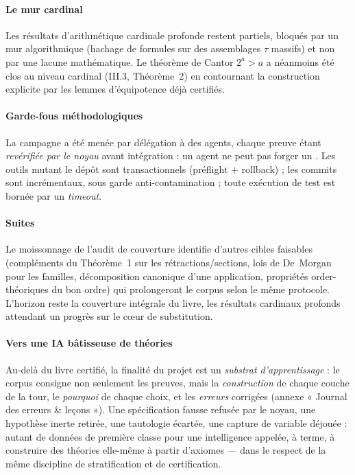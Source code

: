 \paragraph{Le mur cardinal} Les résultats d'arithmétique cardinale profonde
restent partiels, bloqués par un mur algorithmique (hachage de formules sur des
assemblages $\tau$ massifs) et non par une lacune mathématique. Le théorème de
Cantor $2^a > a$ a néanmoins été clos au niveau cardinal (III.3, Théorème~2) en
contournant la construction explicite par les lemmes d'équipotence déjà
certifiés.

\paragraph{Garde-fous méthodologiques} La campagne a été menée par délégation à
des agents, chaque preuve étant \emph{revérifiée par le noyau} avant
intégration : un agent ne peut pas forger un \theoreme{}. Les outils mutant le
dépôt sont transactionnels (préflight $+$ rollback) ; les commits sont
incrémentaux, sous garde anti-contamination ; toute exécution de test est bornée
par un \emph{timeout}.

\paragraph{Suites} Le moissonnage de l'audit de couverture identifie d'autres
cibles faisables (compléments du Théorème~1 sur les rétractions/sections, lois
de De~Morgan pour les familles, décomposition canonique d'une application,
propriétés order-théoriques du bon ordre) qui prolongeront le corpus selon le
même protocole. L'horizon reste la couverture intégrale du livre, les résultats
cardinaux profonds attendant un progrès sur le c\oe ur de substitution.

\paragraph{Vers une IA bâtisseuse de théories} Au-delà du livre certifié, la
finalité du projet est un \emph{substrat d'apprentissage} : le corpus consigne
non seulement les preuves, mais la \emph{construction} de chaque couche de la
tour, le \emph{pourquoi} de chaque choix, et les \emph{erreurs} corrigées
(annexe « Journal des erreurs \& leçons »). Une spécification fausse refusée par
le noyau, une hypothèse inerte retirée, une tautologie écartée, une capture de
variable déjouée : autant de données de première classe pour une intelligence
appelée, à terme, à construire des théories elle-même à partir d'axiomes ---
dans le respect de la même discipline de stratification et de certification.
